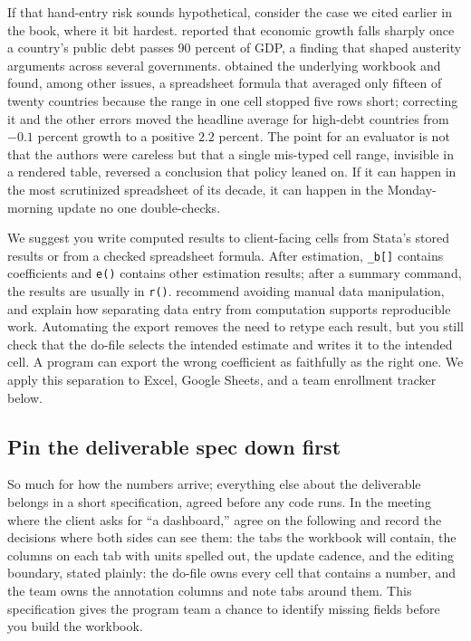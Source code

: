 \documentclass[
    a4paper,
    fontsize=10pt,
    twoside=true,
    numbers=noenddot,
]{kaobook}
\begin{document}
If that hand-entry risk sounds hypothetical, consider the case we cited earlier in the book, where it bit hardest. \textcite{reinhart2010debt} reported that economic growth falls sharply once a country's public debt passes 90 percent of GDP, a finding that shaped austerity arguments across several governments. \textcite{herndon2014debt} obtained the underlying workbook and found, among other issues, a spreadsheet formula that averaged only fifteen of twenty countries because the range in one cell stopped five rows short; correcting it and the other errors moved the headline average for high-debt countries from $-0.1$ percent growth to a positive $2.2$ percent. The point for an evaluator is not that the authors were careless but that a single mis-typed cell range, invisible in a rendered table, reversed a conclusion that policy leaned on. If it can happen in the most scrutinized spreadsheet of its decade, it can happen in the Monday-morning update no one double-checks.

We suggest you write computed results to client-facing cells from Stata's stored results or from a checked spreadsheet formula. After estimation, \texttt{\_b[]} contains coefficients and \texttt{e()} contains other estimation results; after a summary command, the results are usually in \texttt{r()}. \textcite{sandve2013reproducible} recommend avoiding manual data manipulation, and \textcite{broman2018spreadsheets} explain how separating data entry from computation supports reproducible work. Automating the export removes the need to retype each result, but you still check that the do-file selects the intended estimate and writes it to the intended cell. A program can export the wrong coefficient as faithfully as the right one. We apply this separation to Excel, Google Sheets, and a team enrollment tracker below.

\subsection{Pin the deliverable spec down first}\label{sec:ch11-spec}
So much for how the numbers arrive; everything else about the deliverable belongs in a short specification, agreed before any code runs. In the meeting where the client asks for \enquote{a dashboard,} agree on the following and record the decisions where both sides can see them: the tabs the workbook will contain, the columns on each tab with units spelled out, the update cadence, and the editing boundary, stated plainly: the do-file owns every cell that contains a number, and the team owns the annotation columns and note tabs around them. This specification gives the program team a chance to identify missing fields before you build the workbook.
\end{document}
